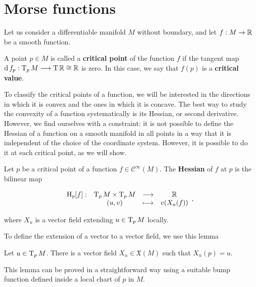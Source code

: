 \section{Morse functions}

Let us consider a differentiable manifold $M$ without boundary, and let $f : M \rightarrow \mathbb{R}$ be a smooth function.

\begin{deff}
	A point $p \in M$ is called a {\bf critical point} of the function $f$ if the tangent map $\operatorname d f_p : \operatorname T_pM \longrightarrow \operatorname T\mathbb{R} \cong \mathbb{R}$ is zero. In this case, we say that $f(p)$ is a {\bf critical value}.
\end{deff}

To classify the critical points of a function, we will be interested in the directions in which it is convex and the ones in which it is concave. The best way to study the convexity of a function systematically is its Hessian, or second derivative. However, we find ourselves with a constraint: it is not possible to define the Hessian of a function on a smooth manifold in all points in a way that it is independent of the choice of the coordinate system. However, it is possible to do it at each critical point, as we will show.

\begin{deff}
	Let $p$ be a critical point of a function $f \in \mathcal{C}^{\infty}(M)$. The {\bf Hessian} of $f$ at $p$ is the bilinear map

\begin{displaymath}
	\begin{array}{rccc} \operatorname H_p[f] : & \operatorname T_pM \times \operatorname T_pM & \longrightarrow & \mathbb{R} \\ & (u,v) & \longmapsto & v(X_u(f)) \end{array} ,
\end{displaymath}

where $X_u$ is a vector field extending $u \in \operatorname T_pM$ locally.
\end{deff}

To define the extension of a vector to a vector field, we use this lemma

\begin{lema}
	Let $u \in \operatorname T_pM$. There is a vector field $X_u \in \mathfrak{X}(M)$ such that $X_u(p) = u$.
\end{lema}

This lemma can be proved in a straightforward way using a suitable bump function defined inside a local chart of $p$ in $M$.

